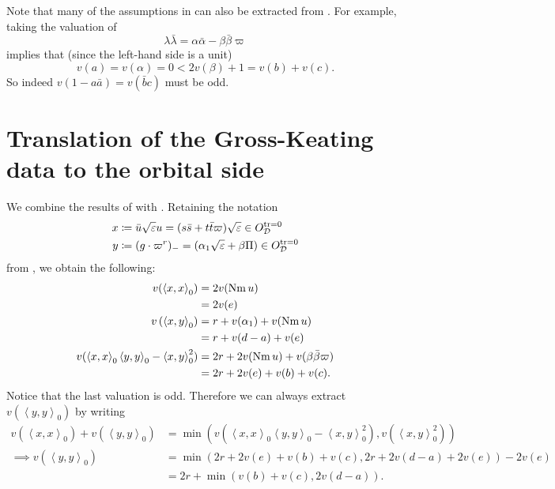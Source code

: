 \begin{remark}
  Note that many of the assumptions in 
  can also be extracted from .
  For example, taking the valuation of
  \[ \lambda \bar \lambda = \alpha \bar \alpha - \beta \bar \beta \varpi \]
  implies that (since the left-hand side is a unit)
  \[ v(a) = v(\alpha) = 0 <  2v(\beta) + 1 = v(b) + v(c). \]
  So indeed $v(1-a \bar a) = v(\bar bc)$ must be odd.
\end{remark}


\section{Translation of the Gross-Keating data to the orbital side}
We combine the results of  with .
Retaining the notation
\begin{align*}
  x &\coloneqq \bar u \sqrt{\varepsilon} u = (s \bar s + t \bar t \varpi) \sqrt{\varepsilon} \in O_\mathcal D^{\operatorname{tr} = 0} \\
  y &\coloneqq (g \cdot \varpi^r)_- = (\alpha_1\sqrt{\varepsilon} + \beta \Pi) \in O_\mathcal D^{\operatorname{tr} = 0}
\end{align*}
from , we obtain the following:
\begin{align*}
  v(\left\langle x,x \right\rangle _0)
    &= 2 v(\operatorname{Nm} u) \\
    &= 2v(e) \\
  v\left( \left\langle x,y \right\rangle _0 \right)
    &= r + v(\alpha_1) + v(\operatorname{Nm} u) \\
    &= r + v(d-a) + v(e) \\
  v(
    \left\langle x,x \right\rangle _0 \left\langle y,y \right\rangle _0
    - \left\langle x,y \right\rangle^2_0
  )
    &= 2r + 2 v(\operatorname{Nm} u) + v(\beta \bar\beta \varpi) \\
    &= 2r + 2v(e) + v(b) + v(c).
\end{align*}
Notice that the last valuation is odd.
Therefore we can always extract $v(\left\langle y,y \right\rangle _0)$ by writing
\begin{align*}
  v\left(\left\langle x,x \right\rangle _0\right) + v\left(\left\langle y,y \right\rangle _0\right)
  &= \min \left( v\left( \left\langle x,x \right\rangle _0 \left\langle y,y \right\rangle _0 - \left\langle x,y \right\rangle^2_0 \right),
    v(\left\langle x,y \right\rangle^2_0) \right) \\
  \implies  v\left(\left\langle y,y \right\rangle _0\right)
  &= \min(2r + 2v(e) + v(b) + v(c), 2r + 2v(d-a) + 2v(e)) - 2v(e) \\
  &= 2r + \min(v(b) + v(c), 2v(d-a)).
\end{align*}
